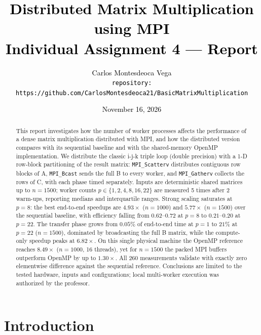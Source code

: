 \documentclass[12pt,a4paper]{article}
\begin{document}
\title{\textcolor{black}{\LARGE\bfseries Distributed Matrix Multiplication
using MPI\\[0.5em]
\normalsize\normalfont Individual Assignment 4 --- Report}}
\author{\textcolor{black}{Carlos Montesdeoca Vega\\[8pt]
\texttt{repository:}\\[2pt]
\small\texttt{https://github.com/CarlosMontesdeoca21/BasicMatrixMultiplication}}}
\date{\textcolor{black}{November 16, 2026}}

\maketitle

\begin{abstract}
This report investigates how the number of worker processes affects the
performance of a dense matrix multiplication distributed with MPI, and how the
distributed version compares with its sequential baseline and with the
shared-memory OpenMP implementation. We distribute the classic i-j-k triple
loop (double precision) with a 1-D row-block partitioning of the result
matrix: \texttt{MPI\_Scatterv} distributes contiguous row blocks of A,
\texttt{MPI\_Bcast} sends the full B to every worker, and
\texttt{MPI\_Gatherv} collects the rows of C, with each phase timed
separately. Inputs are deterministic shared matrices up to $n = 1500$; worker
counts $p \in \{1, 2, 4, 8, 16, 22\}$ are measured 5 times after 2 warm-ups,
reporting medians and interquartile ranges. Strong scaling saturates at
$p = 8$: the best end-to-end speedups are $4.93\times$ ($n = 1000$) and
$5.77\times$ ($n = 1500$) over the sequential baseline, with efficiency
falling from $0.62$--$0.72$ at $p = 8$ to $0.21$--$0.20$ at $p = 22$. The
transfer phase grows from $0.05\%$ of end-to-end time at $p = 1$ to $21\%$ at
$p = 22$ ($n = 1500$), dominated by broadcasting the full B matrix, while the
compute-only speedup peaks at $6.82\times$. On this single physical machine
the OpenMP reference reaches $8.49\times$ ($n = 1000$, 16 threads), yet for
$n = 1500$ the packed MPI buffers outperform OpenMP by up to $1.30\times$.
All 260 measurements validate with exactly zero elementwise difference
against the sequential reference. Conclusions are limited to the tested
hardware, inputs and configurations; local multi-worker execution was
authorized by the professor.
\end{abstract}

\section{Introduction}
\label{sec:intro}
\end{document}
